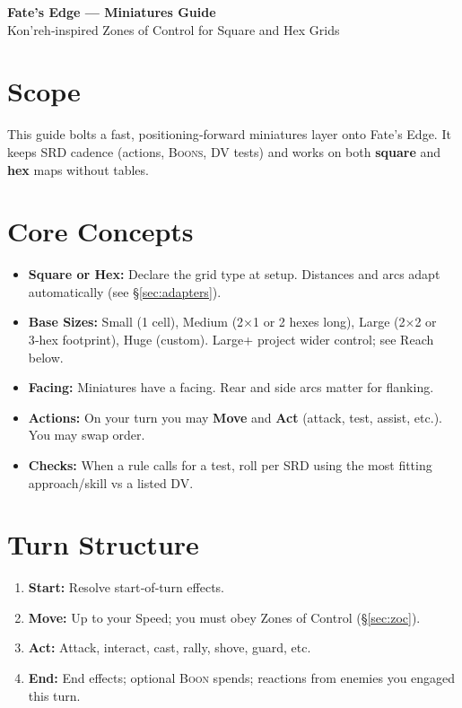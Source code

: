 \documentclass[11pt]{article}
\newcommand{\Boon}{\textsc{Boon}}
\newcommand{\Boons}{\textsc{Boons}}
\newcommand{\DV}{\textsc{DV}}
\begin{document}
\begin{center}
{\LARGE \textbf{Fate’s Edge — Miniatures Guide}}\\[4pt]
{\large Kon’reh‑inspired Zones of Control for Square and Hex Grids}
\end{center}

\section{Scope}
This guide bolts a fast, positioning‑forward miniatures layer onto Fate’s Edge. It keeps SRD cadence (actions, \Boons{}, \DV{} tests) and works on both \textbf{square} and \textbf{hex} maps without tables.

\section{Core Concepts}
\begin{itemize}
  \item \textbf{Square or Hex:} Declare the grid type at setup. Distances and arcs adapt automatically (see \S\ref{sec:adapters}).
  \item \textbf{Base Sizes:} Small (1 cell), Medium (2×1 or 2 hexes long), Large (2×2 or 3‑hex footprint), Huge (custom). Large+ project wider control; see Reach below.
  \item \textbf{Facing:} Miniatures have a facing. Rear and side arcs matter for flanking.
  \item \textbf{Actions:} On your turn you may \textbf{Move} and \textbf{Act} (attack, test, assist, etc.). You may swap order.
  \item \textbf{Checks:} When a rule calls for a test, roll per SRD using the most fitting approach/skill vs a listed \DV{}.
\end{itemize}

\section{Turn Structure}
\begin{enumerate}
  \item \textbf{Start:} Resolve start‑of‑turn effects.
  \item \textbf{Move:} Up to your Speed; you must obey Zones of Control (\S\ref{sec:zoc}).
  \item \textbf{Act:} Attack, interact, cast, rally, shove, guard, etc.
  \item \textbf{End:} End effects; optional \Boon{} spends; reactions from enemies you engaged this turn.
\end{enumerate}
\end{document}
